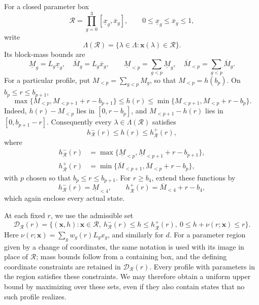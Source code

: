 \documentclass[11pt]{article}
\theoremstyle{definition}
\theoremstyle{remark}
\begin{document}
For a closed parameter box
\begin{equation}\label{eq:cert-mass-box}
 \mathcal R=\prod_{g=0}^3[\underline x_g,\overline x_g],
 \qquad 0\le\underline x_g\le\overline x_g\le1,
\end{equation}
write
\[
 \Lambda(\mathcal R)=\{\lambda\in\Lambda:
                        \mathbf x(\lambda)\in\mathcal R\}.
\]
Its block-mass bounds are
\begin{equation}\label{eq:cert-mass-ranges}
 \underline M_g=L_g\underline x_g,\quad
 \overline M_g=L_g\overline x_g,\qquad
 \underline M_{<p}=\sum_{g<p}\underline M_g,\quad
 \overline M_{<p}=\sum_{g<p}\overline M_g.
\end{equation}
For a particular profile, put $M_{<p}=\sum_{g<p}M_g$, so that $M_{<p}=h(b_p)$.
On $b_p\le r\le b_{p+1}$,
\begin{equation}\label{eq:cert-path-cone-exact}
 \max\{M_{<p},M_{<p+1}+r-b_{p+1}\}
 \le h(r)\le\min\{M_{<p+1},M_{<p}+r-b_p\}.
\end{equation}
Indeed, $h(r)-M_{<p}$ lies in $[0,r-b_p]$, and
$M_{<p+1}-h(r)$ lies in $[0,b_{p+1}-r]$.
Consequently every $\lambda\in\Lambda(\mathcal R)$ satisfies
\begin{equation}\label{eq:cert-path-cone}
 h^-_{\mathcal R}(r)\le h(r)\le h^+_{\mathcal R}(r),
\end{equation}
where
\begin{align*}
 h^-_{\mathcal R}(r)&=\max\{\underline M_{<p},
                              \underline M_{<p+1}+r-b_{p+1}\},\\
 h^+_{\mathcal R}(r)&=\min\{\overline M_{<p+1},
                              \overline M_{<p}+r-b_p\},
\end{align*}
with $p$ chosen so that $b_p\le r\le b_{p+1}$.
For $r\ge b_4$, extend these functions by
\begin{equation}\label{eq:cert-tail-state}
 h^-_{\mathcal R}(r)=\underline M_{<4},\qquad
 h^+_{\mathcal R}(r)=\overline M_{<4}+r-b_4,
\end{equation}
which again enclose every actual state.

At each fixed $r$, we use the admissible set
\begin{equation}\label{eq:cert-state-domain}
 \mathcal D_{\mathcal R}(r)=
 \{(\mathbf x,h):\mathbf x\in\mathcal R,\
 h^-_{\mathcal R}(r)\le h\le h^+_{\mathcal R}(r),\
 0\le h+\nu(r;\mathbf x)\le r\}.
\end{equation}
Here $\nu(r;\mathbf x)=\sum_g w_g(r)L_gx_g$, and similarly for $d$.
For a parameter region given by a change of coordinates, the same notation
is used with its image in place of $\mathcal R$; mass bounds follow from a
containing box, and the defining coordinate constraints are retained in
$\mathcal D_{\mathcal R}(r)$.
Every profile with parameters in the region satisfies these constraints.
We may therefore obtain a uniform upper bound by maximizing over these
sets, even if they also contain states that no such profile realizes.
\end{document}
